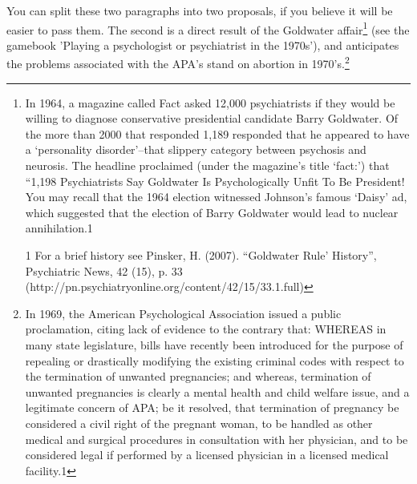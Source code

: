 You can split these two paragraphs into two proposals, if you believe it will be easier to pass them. The second is a direct result of the Goldwater affair\footnote{In 1964, a magazine called Fact asked 12,000 psychiatrists if they would be willing to diagnose conservative presidential candidate Barry Goldwater. Of the more than 2000 that responded 1,189 responded that he appeared to have a `personality disorder'--that slippery category between psychosis and neurosis. The headline proclaimed (under the magazine's title `fact:') that “1,198 Psychiatrists Say Goldwater Is Psychologically Unfit To Be President! You may recall that the 1964 election witnessed Johnson's famous `Daisy' ad, which suggested that the election of Barry Goldwater would lead to nuclear annihilation.⁠1 

1 For a brief history see Pinsker, H. (2007). “Goldwater Rule' History”, Psychiatric News, 42 (15), p. 33 (http:\slash \slash pn.psychiatryonline.org\slash content\slash 42\slash 15\slash 33.1.full)} (see the gamebook 'Playing a psychologist or psychiatrist in the 1970s’), and anticipates the problems associated with the APA’s stand on abortion in 1970’s.\footnote{In 1969, the American Psychological Association issued a public proclamation, citing lack of evidence to the contrary that:
WHEREAS in many state legislature, bills have recently been introduced for the purpose of repealing or drastically modifying the existing criminal codes with respect to the termination of unwanted pregnancies; and whereas, termination of unwanted pregnancies is clearly a mental health and child welfare issue, and a legitimate concern of APA; be it resolved, that termination of pregnancy be considered a civil right of the pregnant woman, to be handled as other medical and surgical procedures in consultation with her physician, and to be considered legal if performed by a licensed physician in a licensed medical facility.⁠1

}
